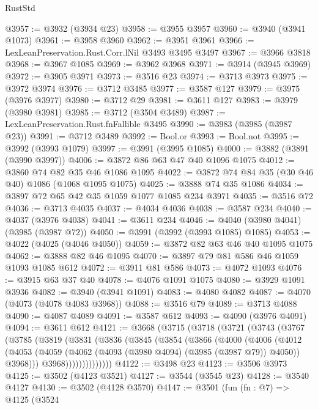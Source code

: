 \begin{lexlean}{RustStd}
\begin{coremodule}
@3957 := @3932 (@3934 @23)
@3958 := @3955 @3957
@3960 := @3940 (@3941 @1073)
@3961 := @3958 @3960
@3962 := @3951 @3961
@3966 := LexLeanPreservation.Rust.Corr.lNil @3493 @3495 @3497
@3967 := @3966 @3818
@3968 := @3967 @1085
@3969 := @3962 @3968
@3971 := @3914 (@3945 @3969)
@3972 := @3905 @3971
@3973 := @3516 @23
@3974 := @3713 @3973
@3975 := @3972 @3974
@3976 := @3712 @3485
@3977 := @3587 @127
@3979 := @3975 (@3976 @3977)
@3980 := @3712 @29
@3981 := @3611 @127
@3983 := @3979 (@3980 @3981)
@3985 := @3712 (@3504 @3489)
@3987 := LexLeanPreservation.Rust.fnFallible @3495
@3990 := @3983 (@3985 (@3987 @23))
@3991 := @3712 @3489
@3992 := Bool.or
@3993 := Bool.not
@3995 := @3992 (@3993 @1079)
@3997 := @3991 (@3995 @1085)
@4000 := @3882 (@3891 (@3990 @3997))
@4006 := @3872 @86 @63 @47 @40 @1096 @1075
@4012 := @3860 @74 @82 @35 @46 @1086 @1095
@4022 := @3872 @74 @84 @35 (@30 @46 @40) @1086 (@1068 @1095 @1075)
@4025 := @3888 @74 @35 @1086
@4034 := @3897 @72 @65 @42 @35 @1059 @1077 @1085 @234 @3971
@4035 := @3516 @72
@4036 := @3713 @4035
@4037 := @4034 @4036
@4038 := @3587 @234
@4040 := @4037 (@3976 @4038)
@4041 := @3611 @234
@4046 := @4040 (@3980 @4041) (@3985 (@3987 @72))
@4050 := @3991 (@3992 (@3993 @1085) @1085)
@4053 := @4022 (@4025 (@4046 @4050))
@4059 := @3872 @82 @63 @46 @40 @1095 @1075
@4062 := @3888 @82 @46 @1095
@4070 := @3897 @79 @81 @586 @46 @1059 @1093 @1085 @612
@4072 := @3911 @81 @586
@4073 := @4072 @1093
@4076 := @3915 @63 @37 @40
@4078 := @4076 @1091 @1075
@4080 := @3929 @1091 @3936
@4082 := @3940 (@3941 @1091)
@4083 := @4080 @4082
@4087 := @4070 (@4073 (@4078 @4083 @3968))
@4088 := @3516 @79
@4089 := @3713 @4088
@4090 := @4087 @4089
@4091 := @3587 @612
@4093 := @4090 (@3976 @4091)
@4094 := @3611 @612
@4121 := @3668
    (@3715
      (@3718
        (@3721
          (@3743
            (@3767
              (@3785
                (@3819
                  (@3831
                    (@3836
                      (@3845
                        (@3854
                          (@3866
                            (@4000
                              (@4006
                                (@4012
                                  (@4053
                                    (@4059
                                      (@4062 (@4093 (@3980 @4094) (@3985 (@3987 @79)) @4050))
                                      @3968)))
                                @3968))))))))))))))
@4122 := @3498 @23
@4123 := @3506 @3973
@4125 := @3502 (@4123 @3521)
@4127 := @3544 (@3545 @23)
@4128 := @3540 @4127
@4130 := @3502 (@4128 @3570)
@4147 := @3501
    (fun (fn : @7) =>
    @4125
      (@3524

\end{coremodule}
\end{lexlean}
